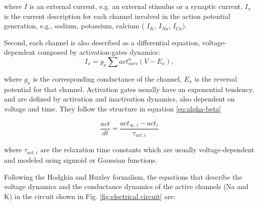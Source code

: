 where $I$ is an external current, e.g. an external stimulus or a synaptic current, $I_{x}$ is the current description for each channel involved in the action potential generation, e.g., sodium, potassium, calcium ( $I_K$, $I_{Na}$, $I_{Ca})$.

Second, each channel is also described as a differential equation, voltage-dependent composed by activation-gates dynamics:
\begin{equation}
I_x =  g_x \sum act_{vars}^n (V - E_x), 
\end{equation}

where $g_x$ is the corresponding conductance of the channel, $E_x$ is the reversal potential for that channel.
Activation gates usually have an exponential tendency, and are defined by activation and inactivation dynamics, also dependent on voltage and time. They follow the structure in equation \ref{eq:alpha-beta}

\begin{equation}
	\label{eq:alpha-beta}
	\frac{act}{dt} = \frac{act_{\infty,i}-act_i}{\tau_{act,i}}
\end{equation}

where $\tau_{act,i}$ are the relaxation time constants which are usually voltage-dependent and modeled using sigmoid or Gaussian functions. 


Following the Hodgkin and Huxley formalism, 
the equations that describe the voltage dynamics and the conductance dynamics of the active channels (Na and K) in the circuit shown in Fig. \ref{fig:electrical circuit} are:

